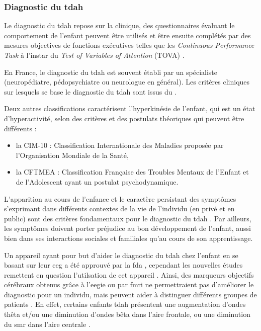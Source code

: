 \subsubsection{Diagnostic du \gls{tdah}}

Le diagnostic du \gls{tdah} repose sur la clinique, des questionnaires évaluant le comportement de l'enfant peuvent être utilisés et être ensuite 
complétés par des mesures objectives de fonctions exécutives telles que les \textit{Continuous Performance Task} \citep{Barkley1991} à l'instar du 
\textit{Test of Variables of Attention} (TOVA) \citep{Forbes1998}.

En France, le diagnostic du \gls{tdah} est souvent établi par un spécialiste (neuropédiatre, pédopsychiatre ou neurologue en général).
Les critères cliniques sur lesquels se base le diagnostic du \gls{tdah} sont issus du \citet{DSM-5}.

Deux autres classifications caractérisent l'hyperkinésie de l'enfant, qui est un état d'hyperactivité, selon des critères et des postulats théoriques 
qui peuvent être différents : 
\begin{itemize}
\item la CIM-10 : Classification Internationale des Maladies proposée par l'Organisation Mondiale de la Santé,
\item la CFTMEA : Classification Française des Troubles Mentaux de l'Enfant et de l'Adolescent ayant un postulat psychodynamique.
\end{itemize}

L'apparition au cours de l'enfance et le caractère persistant des symptômes s'exprimant dans différents contextes de la vie de l'individu (en privé et 
en public) sont des critères fondamentaux pour le diagnostic du \gls{tdah} \citep{HAS}. Par ailleurs, les symptômes doivent porter préjudice au bon 
développement de l'enfant, aussi bien dans ses interactions sociales et familiales qu'au cours de son apprentissage. 

Un appareil ayant pour but d'aider le diagnostic du \gls{tdah} chez l'enfant en se basant sur leur \gls{eeg} 
a été approuvé par la \gls{fda} \citep{FDA, NebaHealth}, cependant les nouvelles études remettent en question l'utilsation de cet appareil \citep{Arns2013, 
Zhang2017}. Ainsi, des marqueurs objectifs cérébraux obtenus grâce à l'\gls{eegie} ou par \gls{fmri} ne permettraient pas d'améliorer le diagnostic pour un individu, mais
peuvent aider à distinguer différents groupes de patients \citep{Johnstone2005, Zhang2017, Clarke2011}. En effet, certains enfants \gls{tdah} 
présentent une augmentation d'ondes thêta et/ou une diminution d'ondes bêta dans l'aire frontale, ou une diminution du \gls{smr} dans l'aire centrale
\citep{Monastra2005, Janzen1995, Loo2018}. 

